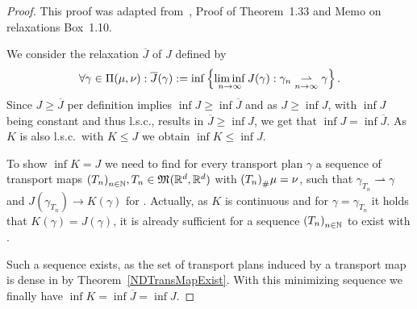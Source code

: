\begin{proof}
	This proof was adapted from~\cite{San2015}, Proof of Theorem~1.33 and Memo on relaxations Box~1.10.

	We consider the relaxation $\overline{J}$ of $J$ defined by
	\[ \forall \gamma \in \TP{\mu}{\nu}: \overline{J}(\gamma) := \inf \left\{ \liminf\limits_{\Ninf} J(\gamma) : \weak{\gamma_n}{\gamma} \right\}. \]
	Since $J \ge \overline{J}$ per definition implies $\inf J \ge \inf \overline{J}$ and as $J \ge \inf J$, with $\inf J$ being constant and thus l.s.c., results in $\overline{J} \ge \inf J$, we get that $\inf J = \inf \overline{J}$. As $K$ is also l.s.c.\ with $K \le J$ we obtain $\inf K \le \inf J$.

	To show $\inf K = J$ we need to find for every transport plan $\gamma$ a sequence of transport maps ${(T_n)}_{\NinN}, T_n \in \MF{\R^d}{\R^d}$ with $\push[(T_n)]{\mu} = \nu$, such that $\gamma_{T_n} \rightharpoonup \gamma$ and $J(\gamma_{T_n}) \rightarrow K(\gamma)$ for \Ninf. Actually, as $K$ is continuous and for $\gamma = \gamma_{T_n}$ it holds that $K(\gamma) = J(\gamma)$, it is already sufficient for a sequence ${(T_n)}_{\NinN}$ to exist with .

	Such a sequence exists, as the set of transport plans induced by a transport map is dense in \TP{\mu}{\nu} by Theorem~\ref{NDTransMapExist}. With this minimizing sequence we finally have $\inf K = \inf \overline{J} = \inf J$.
\end{proof}